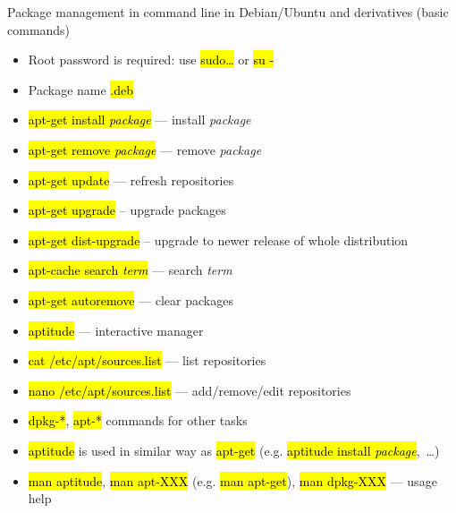 \documentclass[compress, ucs, xelatex, 11pt, xcolor=svgnames,
  hyperref={
    bookmarks=true,
    unicode=true,
    colorlinks=true,
    pdftitle={Linux, command line and MetaCentrum},
    plainpages=false,
    pdfauthor={Vojtech Zeisek},
    pdfsubject={Course about use of Linux command line, writing shell scripts and using MetaCentrum of CESNET},
    pdfcreator={XeLaTeX},
    pdfkeywords={Linux, GNU, BASH, shell, command line, MetaCentrum},
    linkcolor=DarkRed,
    anchorcolor=DarkBlue,
    citecolor=Indigo,
    filecolor=NavyBlue,
    menucolor=DarkMagenta,
    urlcolor=DarkBlue,
    pdftex},
  url={hyphens, lowtilde} %
  ]{beamer}
\renewcommand{\texttt}[1]{\hl{\ttfamily #1}}
\begin{document}
\begin{frame}[allowframebreaks]{Package management in command line in Debian/Ubuntu and derivatives (basic commands)}
  \begin{itemize}
    \item Root password is required: use \texttt{sudo\ldots} or \texttt{su -}
    \item Package name \texttt{*.deb}
    \item \texttt{apt-get install \textit{package}} --- install \textit{package}
    \item \texttt{apt-get remove \textit{package}} --- remove \textit{package}
    \item \texttt{apt-get update} --- refresh repositories
    \item \texttt{apt-get upgrade} -- upgrade packages
    \item \texttt{apt-get dist-upgrade} -- upgrade to newer release of whole distribution
    \item \texttt{apt-cache search \textit{term}} --- search \textit{term}
    \item \texttt{apt-get autoremove} --- clear packages
    \item \texttt{aptitude} --- interactive manager
    \item \texttt{cat /etc/apt/sources.list} --- list repositories
    \item \texttt{nano /etc/apt/sources.list} --- add/remove/edit repositories
    \item \texttt{dpkg-*}, \texttt{apt-*} commands for other tasks
    \item \texttt{aptitude} is used in similar way as \texttt{apt-get} (e.g. \texttt{aptitude install \textit{package}},~\ldots)
    \item \texttt{man aptitude}, \texttt{man apt-XXX} (e.g. \texttt{man apt-get}), \texttt{man dpkg-XXX} --- usage help
  \end{itemize}
\end{frame}
\end{document}
